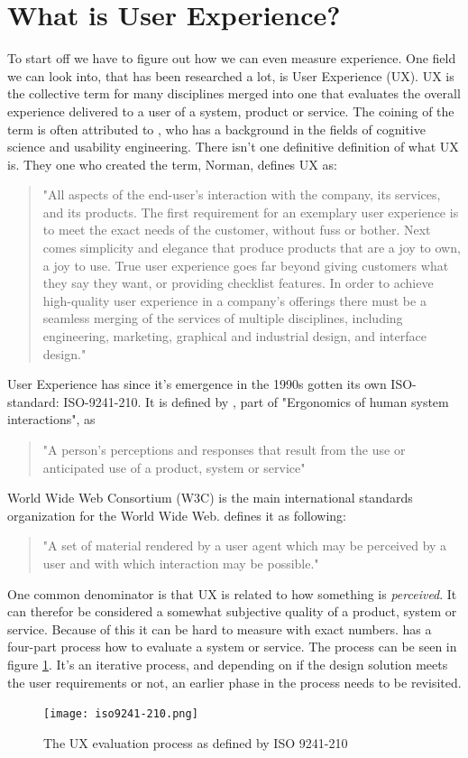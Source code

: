 \documentclass{cslthse-msc}
\begin{document}
    \section{What is User Experience?}
    To start off we have to figure out how we can even measure experience. One field we can look into, that has been researched a lot, is User Experience (UX). UX is the collective term for many disciplines merged into one that evaluates the overall experience delivered to a user of a
    system, product or service. The coining of the term is often attributed to \citet{norman}, who has a background in the fields of cognitive science and usability engineering. There isn't one definitive definition of what UX is. They one who created the term, Norman, defines UX as:
    \begin{quote}
        "All aspects of the end-user’s interaction with the company, its services, and its products. The first requirement for an exemplary user experience is to meet the exact needs of the customer, without fuss or bother. Next comes simplicity and elegance that produce products that are a joy to own, a joy to use. True user experience goes far beyond giving customers what they say they want, or providing checklist features. In order to achieve high-quality user experience in a company’s offerings there must be a seamless merging of the services of multiple disciplines, including engineering, marketing, graphical and industrial design, and interface design."
    \end{quote}
    User Experience has since it's emergence in the 1990s gotten its own ISO-standard: ISO-9241-210. It is defined by \citet{iso9241}, part
    of "Ergonomics of human system interactions", as \begin{quote}
                                                         "A person's perceptions and responses that result from the use or anticipated use of a product, system or service"
    \end{quote}
    World Wide Web Consortium (W3C) is the main international standards organization for the World Wide Web. \citet{w3c} defines it as following:
    \begin{quote}
        "A set of material rendered by a user agent which may be perceived by a user and with which interaction may be possible."
    \end{quote}
    One common denominator is that UX is related to how something is \textit{perceived}. It can therefor be considered a somewhat
    subjective quality of a product, system or service. Because of this it can be hard to measure with exact numbers. \citet{iso9241} has a four-part process how to evaluate a system or service. The process can be seen in figure \ref{fig:iso9241}. It's an iterative process, and depending on if the design solution  meets the user requirements or not, an earlier phase in the process needs to be revisited.
    \begin{figure}[H]
        \centering
        \texttt{[image: iso9241-210.png]}
        \caption{The UX evaluation process as defined by ISO 9241-210}
        \label{fig:iso9241}
    \end{figure}
\end{document}
